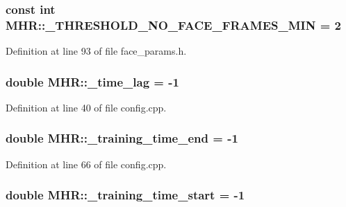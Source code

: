 \hypertarget{namespace_m_h_r_adc786b108805d8d2ad944595ea2b7092}{
\subsubsection[{\+\_\+\+T\+H\+R\+E\+S\+H\+O\+L\+D\+\_\+\+N\+O\+\_\+\+F\+A\+C\+E\+\_\+\+F\+R\+A\+M\+E\+S\+\_\+\+M\+I\+N}]{\setlength{\rightskip}{0pt plus 5cm}const int M\+H\+R\+::\+\_\+\+T\+H\+R\+E\+S\+H\+O\+L\+D\+\_\+\+N\+O\+\_\+\+F\+A\+C\+E\+\_\+\+F\+R\+A\+M\+E\+S\+\_\+\+M\+I\+N = 2}}\label{namespace_m_h_r_adc786b108805d8d2ad944595ea2b7092}


Definition at line 93 of file face\+\_\+params.\+h.

\hypertarget{namespace_m_h_r_abe9f5a6b09e1219712f2b5912e68506d}{
\subsubsection[{\+\_\+time\+\_\+lag}]{\setlength{\rightskip}{0pt plus 5cm}double M\+H\+R\+::\+\_\+time\+\_\+lag = -\/1}}\label{namespace_m_h_r_abe9f5a6b09e1219712f2b5912e68506d}


Definition at line 40 of file config.\+cpp.

\hypertarget{namespace_m_h_r_a6ee9276234c51d213a3b1631eee5f315}{
\subsubsection[{\+\_\+training\+\_\+time\+\_\+end}]{\setlength{\rightskip}{0pt plus 5cm}double M\+H\+R\+::\+\_\+training\+\_\+time\+\_\+end = -\/1}}\label{namespace_m_h_r_a6ee9276234c51d213a3b1631eee5f315}


Definition at line 66 of file config.\+cpp.

\hypertarget{namespace_m_h_r_a32705f521f2a65e0b5c5454b328c26db}{
\subsubsection[{\+\_\+training\+\_\+time\+\_\+start}]{\setlength{\rightskip}{0pt plus 5cm}double M\+H\+R\+::\+\_\+training\+\_\+time\+\_\+start = -\/1}}\label{namespace_m_h_r_a32705f521f2a65e0b5c5454b328c26db}


